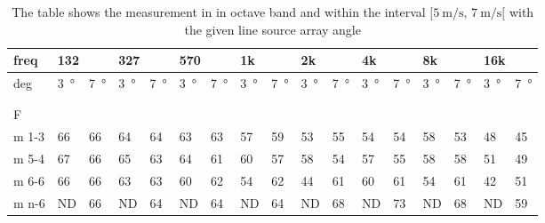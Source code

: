 \begin{table}[H]
\centering
\caption{The table shows the measurement in in octave band and within the interval $[\SI{5}{\meter\per\second},\, \SI{7}{\meter\per\second}[ $ with the given line source array angle}
\begin{tabular}{l|l|l|l|l|l|l|l|l|l|l|l|l|l|l|ll}
freq & \multicolumn{2}{l|}{132} & \multicolumn{2}{l|}{327} & \multicolumn{2}{l|}{570} & \multicolumn{2}{l|}{1k} & \multicolumn{2}{l|}{2k} & \multicolumn{2}{l|}{4k} & \multicolumn{2}{l|}{8k} & \multicolumn{2}{l}{16k}  \\ \hline
deg  &     \SI{3}{\degree}        &    \SI{7}{\degree}          &     \SI{3}{\degree}          &   \SI{7}{\degree}           &       \SI{3}{\degree}        &      \SI{7}{\degree}        &     \SI{3}{\degree}         &     \SI{7}{\degree}         &       \SI{3}{\degree}       &    \SI{7}{\degree}          &      \SI{3}{\degree}        &        \SI{7}{\degree}      &      \SI{3}{\degree}        &       \SI{7}{\degree}       & \multicolumn{1}{l|}{ \SI{3}{\degree} } &  \SI{7}{\degree}  \\ \hline
 & \multicolumn{2}{l|}{} & \multicolumn{2}{l|}{} & \multicolumn{2}{l|}{} & \multicolumn{2}{l|}{} & \multicolumn{2}{l|}{} & \multicolumn{2}{l|}{}& \multicolumn{2}{l|}{}& \multicolumn{2}{l}{}     \\ 
\multicolumn{17}{l}{ } \\   
F & \multicolumn{2}{l|}{} & \multicolumn{2}{l|}{} & \multicolumn{2}{l|}{} & \multicolumn{2}{l|}{} & \multicolumn{2}{l|}{} & \multicolumn{2}{l|}{}& \multicolumn{2}{l|}{}& \multicolumn{2}{l}{}     \\ \hline
m 1-3  &     66   &      66  &   64    &  64      &        63     &    63       &  57       &    59        &    53         &    55        &      54       &     54       &      58      &    53        & \multicolumn{1}{l|}{48} &  45\\
m 5-4   &    67  &       66  &      65  & 63     &       64      &     61      &   60     &     57       &    58         &     54       &      57       &     55       &       58     &       58     & \multicolumn{1}{l|}{51} &  49\\
m 6-6   &    66  &      66   &     63   &   63    &      60       &     62      &  54       &     62       &     44        &      61      &        60     &       61     &       54     &       61     & \multicolumn{1}{l|}{42} & 51 \\
m n-6   &    ND  &      66   &   ND  &   64     &   ND        &     64      &    ND     &     64       &      ND      &       68     &      ND      &       73     &        ND   &       68     & \multicolumn{1}{l|}{ND} &  59\\

\end{tabular}
\end{table}
